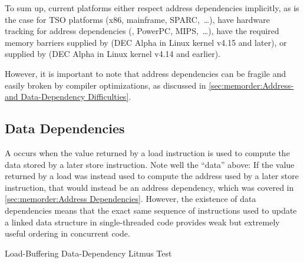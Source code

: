{{	To sum up, current platforms either respect address dependencies
	implicitly, as is the case for TSO platforms (x86, mainframe,
	SPARC,~\dots), have hardware tracking for address dependencies
	(\ARM, PowerPC, MIPS,~\dots), have the required memory barriers
	supplied by  (DEC Alpha in Linux kernel v4.15 and
	later), or supplied by
	 (DEC Alpha in Linux kernel v4.14 and earlier).
}\QuickQuizEndB
%
\QuickQuizEndM
%
\QuickQuizEndE
}

However, it is important to note that address dependencies can
be fragile and easily broken by compiler optimizations, as discussed in
\cref{sec:memorder:Address- and Data-Dependency Difficulties}.

\subsection{Data Dependencies}
\label{sec:memorder:Data Dependencies}

A \emph{} occurs when the value returned by a load
instruction is used to compute the data stored by a later store
instruction.
Note well the ``data'' above:
If the value returned by a load was instead used to compute the address
used by a later store instruction, that would instead be an address
dependency, which was covered in
\cref{sec:memorder:Address Dependencies}.
However, the existence of data dependencies means that the exact same
sequence of instructions used to update a linked data structure in
single-threaded code provides weak but extremely useful ordering in
concurrent code.

\begin{listing}

\caption{Load-Buffering Data-Dependency Litmus Test}
\label{lst:memorder:Load-Buffering Data-Dependency Litmus Test}
\end{listing}

